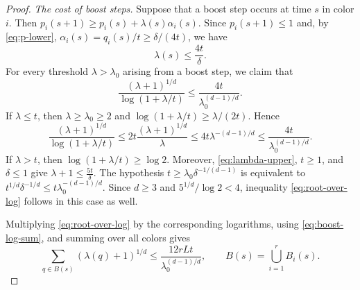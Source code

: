 \documentclass[10pt,a4paper]{amsart}
\begin{document}
\begin{proof}
\medskip
\noindent\emph{The cost of boost steps.}
Suppose that a boost step occurs at time $s$ in color $i$. Then
$
 p_i(s+1)\ge p_i(s)+\lambda(s)\alpha_i(s).
$
Since $p_i(s+1)\le1$ and, by \eqref{eq:p-lower},
$\alpha_i(s)=q_i(s)/t\ge\delta/(4t)$, we have
\begin{equation}\label{eq:lambda-upper}
 \lambda(s)\le\frac{4t}{\delta}.
\end{equation}
For every threshold $\lambda>\lambda_0$ arising from a boost step, we claim
that
\begin{equation}\label{eq:root-over-log}
 \frac{(\lambda+1)^{1/d}}
 {\log(1+\lambda/t)}
 \le\frac{4t}{\lambda_0^{(d-1)/d}}.
\end{equation}
If $\lambda\le t$, then $\lambda\ge\lambda_0\ge2$ and
$\log(1+\lambda/t)\ge\lambda/(2t)$. Hence
\[
 \frac{(\lambda+1)^{1/d}}{\log(1+\lambda/t)}
 \le2t\frac{(\lambda+1)^{1/d}}{\lambda}
 \le4t\lambda^{-(d-1)/d}
 \le\frac{4t}{\lambda_0^{(d-1)/d}}.
\]
If $\lambda>t$, then $\log(1+\lambda/t)\ge\log2$. Moreover,
\eqref{eq:lambda-upper}, $t\ge1$, and $\delta\le1$ give
$\lambda+1\le\frac{5t}{\delta}.
$
The hypothesis $t\ge\lambda_0\delta^{-1/(d-1)}$ is equivalent to
$t^{1/d}\delta^{-1/d}
 \le t\lambda_0^{-(d-1)/d}.
$
Since $d\ge3$ and $5^{1/d}/\log2<4$, inequality
\eqref{eq:root-over-log} follows in this case as well.

Multiplying \eqref{eq:root-over-log} by the corresponding logarithms, using
\eqref{eq:boost-log-sum}, and summing over all colors gives
\begin{equation}\label{eq:boost-root-sum}
 \sum_{q\in B(s)}(\lambda(q)+1)^{1/d}
 \le\frac{12rLt}{\lambda_0^{(d-1)/d}},
 \qquad
 B(s)=\bigcup_{i=1}^rB_i(s).
\end{equation}


\end{proof}
\end{document}
